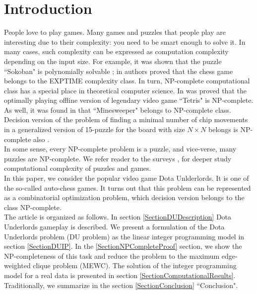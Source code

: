 \documentclass[smallextended]{svjour3}       %
\begin{document}
\section{Introduction}
People love to play games. Many games and puzzles that people play are interesting due to their complexity: you need to be smart enough to solve it. In many cases, such complexity can be expressed as computation complexity depending on the input size. For example, it was shown that the puzzle ``Sokoban" is polynomially solvable \cite{hearn2005pspace}; in \cite{fraenkel1981computing} authors proved that the chess game belongs to the EXPTIME complexity class.
In turn, NP-complete computational class has a special place in theoretical computer science.
In \cite{breukelaar2004tetris} was proved that the optimally playing offline version of legendary video game ``Tetris" is NP-complete. As well, it was found in \cite{kaye2000minesweeper} that ``Minesweeper" belongs to NP-complete class. Decision version of the problem of finding a minimal number of chip movements in a generalized version of 15-puzzle for the board with size $N \times N$ belongs is NP-complete also \cite{ratner1986finding}.\\
In some sense, every NP-complete problem is a puzzle, and vice-verse, many puzzles are NP-complete. We refer reader to the surveys \cite{costa2018computational}, \cite{kendall2008survey} for deeper study computational complexity of puzzles and games.\\
In this paper, we consider the popular video game Dota Unlderlords. It is one of the so-called auto-chess games. It turns out that this problem can be represented as a combinatorial optimization problem, which decision version  belongs to the class NP-complete.\\
The article is organized as follows. In section \ref{SectionDUDescription} Dota Underlords gameplay is described.
We present a formulation of the Dota Underlords problem (DU problem) as the linear integer programming model in section \ref{SectionDUIP}. In the \ref{SectionNPCompleteProof} section, we show the NP-completeness of this task and reduce the problem to the maximum edge-weighted clique problem (MEWC). The solution of the integer programming model for a real data is presented in section \ref{SectionComputationalResults}. Traditionally, we summarize in the section \ref{SectionConclusion} ``Conclusion".
\end{document}
